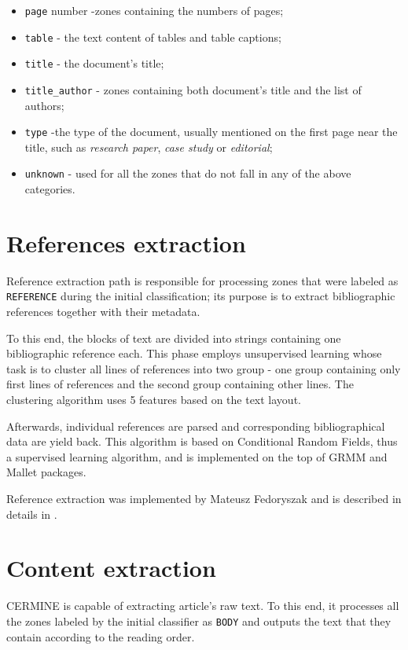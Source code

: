 \begin{itemize}
    \item \verb+page+ number -zones containing the numbers of pages;
    \item \verb+table+ - the text content of tables and table captions;
    \item \verb+title+ - the document's title;
    \item \verb+title_author+ - zones containing both document's title and the list of authors;
    \item \verb+type+ -the type of the document, usually mentioned on the first page near the title, such as \textit{research paper}, \textit{case study} or \textit{editorial};
    \item \verb+unknown+ - used for all the zones that do not fall in any of the above categories.
\end{itemize}

\section{References extraction}
Reference extraction path is responsible for processing zones that were labeled as \verb+REFERENCE+ during the initial classification; its purpose is to extract bibliographic references together with their metadata.

To this end, the blocks of text are divided into strings containing one bibliographic reference each. This phase employs unsupervised learning whose task is to cluster all lines of references into two group - one group containing only first lines of references and the second group containing other lines. The clustering algorithm uses 5 features based on the text layout.

Afterwards, individual references are parsed and corresponding bibliographical data are yield back. This algorithm is based on Conditional Random Fields, thus a supervised learning algorithm, and is implemented on the top of GRMM and Mallet packages.

Reference extraction was implemented by Mateusz Fedoryszak and is described in details in \cite{DominikaTkaczykPaweSzostekMateuszFedoryszakPiotrJanDendek2014}.
\section{Content extraction}
CERMINE is capable of extracting article's raw text. To this end, it processes all the zones labeled by the initial classifier as \verb+BODY+ and outputs the text that they contain according to the reading order. 

